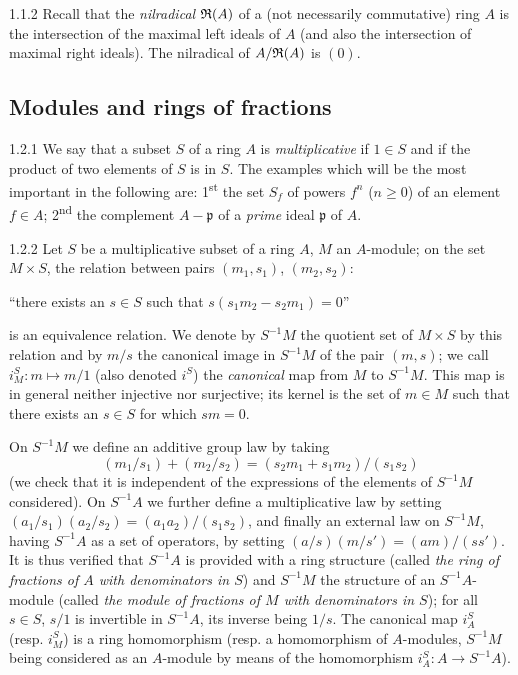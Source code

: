 \begin{env}{1.1.2}
\label{env-0.1.1.2}
Recall that the \emph{nilradical} $\mathfrak{R}(A)$ of a (not necessarily
commutative) ring $A$ is the intersection of the maximal left ideals of $A$ (and
also the intersection of maximal right ideals). The nilradical of $A/\mathfrak{R}(A)$
is $(0)$.
\end{env}

\subsection{Modules and rings of fractions}
\label{0-prelim-1.2}

\begin{env}{1.2.1}
\label{env-0.1.2.1}
We say that a subset $S$ of a ring $A$ is \emph{multiplicative} if $1\in S$ and
if the product of two elements of $S$ is in $S$. The examples which will be the
most important in the following are: 1\textsuperscript{st} the set $S_f$ of
powers $f^n$ ($n\geqslant 0$) of an element $f\in A$; 2\textsuperscript{nd} the
complement $A-\mathfrak{p}$ of a \emph{prime} ideal $\mathfrak{p}$ of $A$.
\end{env}

\begin{env}{1.2.2}
\label{env-0.1.2.2}
Let $S$ be a multiplicative subset of a ring $A$, $M$ an $A$-module; on the set
$M\times S$, the relation between pairs $(m_1,s_1)$, $(m_2,s_2)$:
\begin{center}
   ``there exists an $s\in S$ such that $s(s_1 m_2-s_2 m_1)=0$''
\end{center}
is an equivalence relation. We denote by $S^{-1}M$ the quotient set of
$M\times S$ by this relation and by $m/s$ the canonical image in $S^{-1}M$ of
the pair $(m,s)$; we call $i_M^S:m\mapsto m/1$ (also denoted $i^S$) the
\emph{canonical} map from $M$ to $S^{-1}M$. This map is in general neither
injective nor surjective; its kernel is the set of $m\in M$ such that there
exists an $s\in S$ for which $sm=0$.

On $S^{-1}M$ we define an additive group law by taking
\[
  (m_1/s_1)+(m_2/s_2)=(s_2 m_1+s_1 m_2)/(s_1 s_2)
\]
(we check that it is independent of the expressions of the elements of $S^{-1}M$
considered). On $S^{-1}A$ we further define a multiplicative law by setting
$(a_1/s_1)(a_2/s_2)=(a_1 a_2)/(s_1 s_2)$, and finally an external law on
$S^{-1}M$, having $S^{-1}A$ as a set of operators, by setting
$(a/s)(m/s')=(am)/(ss')$. It is thus verified that $S^{-1}A$ is provided with a
ring structure (called \emph{the ring of fractions of $A$ with denominators in
$S$}) and $S^{-1}M$ the structure of an $S^{-1}A$-module (called \emph{the
module of fractions of $M$ with denominators in $S$}); for all $s\in S$, $s/1$
is invertible in $S^{-1}A$, its inverse being $1/s$. The canonical map $i_A^S$
(resp. $i_M^S$) is a ring homomorphism (resp. a homomorphism of $A$-modules,
$S^{-1}M$ being considered as an $A$-module by means of the homomorphism
$i_A^S:A\to S^{-1}A$).
\end{env}

